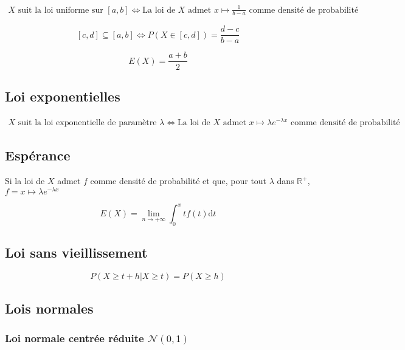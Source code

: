 \documentclass{article}
\newcommand{\R}{\mathds{R}}
\begin{document}
\begin{equation*}
    \begin{split}
        \text{$X$ suit la loi uniforme sur $[a, b]$} \iff \text{La loi de $X$ admet $x\mapsto \frac{1}{b-a}$ comme densité de probabilité}
    \end{split}
\end{equation*}

\[[c, d] \subseteq [a, b] \iff P(X \in [c, d]) = \frac{d-c}{b-a}\]

\[E(X) = \frac{a+b}{2}\]

\subsection{Loi exponentielles}


\begin{equation*}
    \begin{split}
        \text{$X$ suit la loi exponentielle de paramètre $\lambda$} \iff \text{La loi de $X$ admet $x\mapsto \lambda e^{-\lambda x}$ comme densité de probabilité}
    \end{split}
\end{equation*}

\subsection{Espérance}

Si la loi de $X$ admet $f$ comme densité de probabilité et que, pour tout $\lambda$ dans $\R^{+}$, $f = x\mapsto \lambda e^{-\lambda x}$

\[
	E(X) = \lim_{n \to +\infty} \int_0^{x} t f(t) \text{d}t
\] 

\subsection{Loi sans vieillissement}

\[P(X \geq t+h | X \geq t) = P(X \geq h)\]                    


\subsection{Lois normales}

\subsubsection{Loi normale centrée réduite $\mathcal{N}(0, 1)$}
\end{document}
